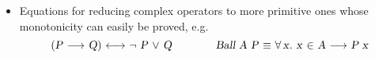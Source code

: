 \begin{isabellebody}
\begin{isamarkuptext}
\begin{itemize}
  \item Equations for reducing complex operators to more primitive
  ones whose monotonicity can easily be proved, e.g.
  \[
  \isa{{\isaliteral{22}{\isachardoublequote}}{\isaliteral{28}{\isacharparenleft}}P\ {\isaliteral{5C3C6C6F6E6772696768746172726F773E}{\isasymlongrightarrow}}\ Q{\isaliteral{29}{\isacharparenright}}\ {\isaliteral{5C3C6C6F6E676C65667472696768746172726F773E}{\isasymlongleftrightarrow}}\ {\isaliteral{5C3C6E6F743E}{\isasymnot}}\ P\ {\isaliteral{5C3C6F723E}{\isasymor}}\ Q{\isaliteral{22}{\isachardoublequote}}} \qquad\qquad
  \isa{{\isaliteral{22}{\isachardoublequote}}Ball\ A\ P\ {\isaliteral{5C3C65717569763E}{\isasymequiv}}\ {\isaliteral{5C3C666F72616C6C3E}{\isasymforall}}x{\isaliteral{2E}{\isachardot}}\ x\ {\isaliteral{5C3C696E3E}{\isasymin}}\ A\ {\isaliteral{5C3C6C6F6E6772696768746172726F773E}{\isasymlongrightarrow}}\ P\ x{\isaliteral{22}{\isachardoublequote}}}
  \]


\end{itemize}
\end{isamarkuptext}
\end{isabellebody}
